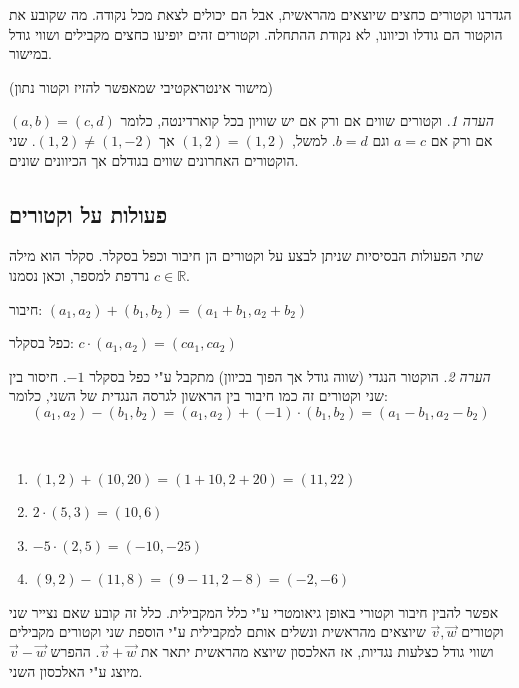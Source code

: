 \documentclass[
  hebrew,
  12pt,
  a4paper,
  oneside]{book}
\theoremstyle{definition}
\theoremstyle{remark}
\theoremstyle{plain}
\theoremstyle{remark}
\newtheorem*{remark}{הערה}
\begin{document}
הגדרנו וקטורים כחצים שיוצאים מהראשית, אבל הם יכולים לצאת מכל נקודה. מה
שקובע את הוקטור הם גודלו וכיוונו, לא נקודת ההתחלה. וקטורים זהים יופיעו
כחצים מקבילים ושווי גודל במישור.

(מישור אינטראקטיבי שמאפשר להזיז וקטור נתון)

\begin{remark}
וקטורים שווים אם ורק אם יש שוויון בכל קוארדינטה, כלומר \((a,b)=(c,d)\)
אם ורק אם \(a=c\) וגם \(b=d\). למשל, \((1,2)=(1,2)\) אך
\((1,2)\neq(1,-2)\). שני הוקטורים האחרונים שווים בגודלם אך הכיוונים
שונים.
\end{remark}

\subsection{פעולות על
וקטורים}\label{ux5e4ux5e2ux5d5ux5dcux5d5ux5ea-ux5e2ux5dc-ux5d5ux5e7ux5d8ux5d5ux5e8ux5d9ux5dd}

שתי הפעולות הבסיסיות שניתן לבצע על וקטורים הן חיבור וכפל בסקלר. סקלר הוא
מילה נרדפת למספר, וכאן נסמנו \(c\in\mathbb{R}\).

חיבור: \((a_{1},a_{2})+(b_{1},b_{2})=(a_{1}+b_{1},a_{2}+b_{2})\)

כפל בסקלר: \(c\cdot(a_{1},a_{2})=(ca_{1},ca_{2})\)

\begin{remark}
הוקטור הנגדי (שווה גודל אך הפוך בכיוון) מתקבל ע"י כפל בסקלר \(-1\).
חיסור בין שני וקטורים זה כמו חיבור בין הראשון לגרסה הנגדית של השני,
כלומר:
\[(a_{1},a_{2})-(b_{1},b_{2})=(a_{1},a_{2})+(-1)\cdot(b_{1},b_{2})=(a_{1}-b_{1},a_{2}-b_{2})\]
\end{remark}

\begin{example}

~

\begin{enumerate}
\def\labelenumi{\arabic{enumi}.}
\item
  \((1,2)+(10,20)=(1+10,2+20)=(11,22)\)
\item
  \(2\cdot(5,3)=(10,6)\)
\item
  \(-5\cdot(2,5)=(-10,-25)\)
\item
  \((9,2)-(11,8)=(9-11,2-8)=(-2,-6)\)
\end{enumerate}

\end{example}

אפשר להבין חיבור וקטורי באופן גיאומטרי ע"י כלל המקבילית. כלל זה קובע שאם
נצייר שני וקטורים \(\vec{v},\vec{w}\) שיוצאים מהראשית ונשלים אותם
למקבילית ע"י הוספת שני וקטורים מקבילים ושווי גודל כצלעות נגדיות, אז
האלכסון שיוצא מהראשית יתאר את \(\vec{v}+\vec{w}\). ההפרש
\(\vec{v}-\vec{w}\) מיוצג ע"י האלכסון השני.
\end{document}

